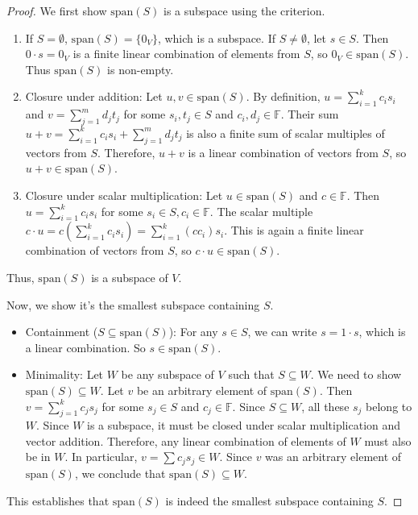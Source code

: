 \documentclass[11pt]{article}
\theoremstyle{definition}
\newcommand{\F}{\mathbb{F}}
\newcommand{\Span}[1]{\text{span}(#1)}
\begin{document}
\begin{proof}
We first show $\Span{S}$ is a subspace using the criterion.
\begin{enumerate}
    \item If $S = \emptyset$, $\Span{S} = \{0_V\}$, which is a subspace. If $S \neq \emptyset$, let $s \in S$. Then $0 \cdot s = 0_V$ is a finite linear combination of elements from $S$, so $0_V \in \Span{S}$. Thus $\Span{S}$ is non-empty.
    \item Closure under addition: Let $u, v \in \Span{S}$. By definition, $u = \sum_{i=1}^k c_i s_i$ and $v = \sum_{j=1}^m d_j t_j$ for some $s_i, t_j \in S$ and $c_i, d_j \in \F$. Their sum $u+v = \sum_{i=1}^k c_i s_i + \sum_{j=1}^m d_j t_j$ is also a finite sum of scalar multiples of vectors from $S$. Therefore, $u+v$ is a linear combination of vectors from $S$, so $u+v \in \Span{S}$.
    \item Closure under scalar multiplication: Let $u \in \Span{S}$ and $c \in \F$. Then $u = \sum_{i=1}^k c_i s_i$ for some $s_i \in S, c_i \in \F$. The scalar multiple $c \cdot u = c (\sum_{i=1}^k c_i s_i) = \sum_{i=1}^k (c c_i) s_i$. This is again a finite linear combination of vectors from $S$, so $c \cdot u \in \Span{S}$.
\end{enumerate}
Thus, $\Span{S}$ is a subspace of $V$.

Now, we show it's the smallest subspace containing $S$.
\begin{itemize}
    \item Containment ($S \subseteq \Span{S}$): For any $s \in S$, we can write $s = 1 \cdot s$, which is a linear combination. So $s \in \Span{S}$.
    \item Minimality: Let $W$ be any subspace of $V$ such that $S \subseteq W$. We need to show $\Span{S} \subseteq W$. Let $v$ be an arbitrary element of $\Span{S}$. Then $v = \sum_{j=1}^k c_j s_j$ for some $s_j \in S$ and $c_j \in \F$. Since $S \subseteq W$, all these $s_j$ belong to $W$. Since $W$ is a subspace, it must be closed under scalar multiplication and vector addition. Therefore, any linear combination of elements of $W$ must also be in $W$. In particular, $v = \sum c_j s_j \in W$. Since $v$ was an arbitrary element of $\Span{S}$, we conclude that $\Span{S} \subseteq W$.
\end{itemize}
This establishes that $\Span{S}$ is indeed the smallest subspace containing $S$.
\end{proof}
\end{document}
